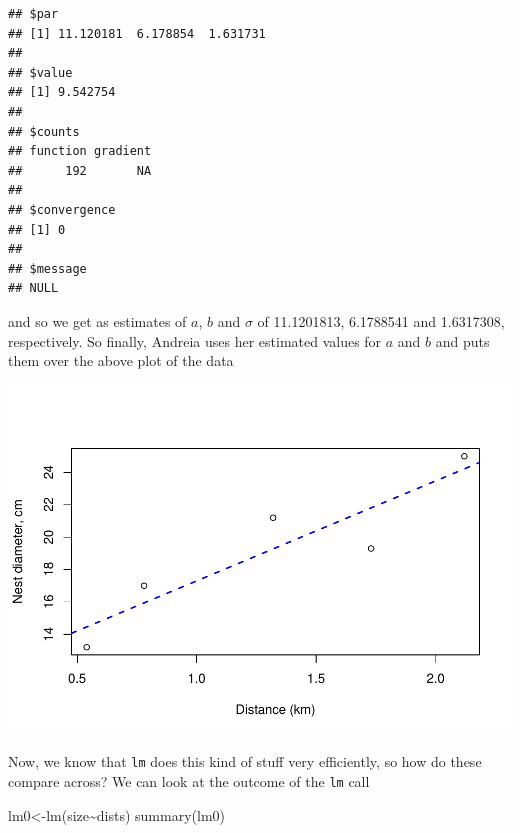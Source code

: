 \documentclass[
]{book}
\newenvironment{Shaded}{\begin{snugshade}}{\end{snugshade}}
\newcommand{\AttributeTok}[1]{\textcolor[rgb]{0.77,0.63,0.00}{#1}}
\newcommand{\DecValTok}[1]{\textcolor[rgb]{0.00,0.00,0.81}{#1}}
\newcommand{\FunctionTok}[1]{\textcolor[rgb]{0.00,0.00,0.00}{#1}}
\newcommand{\NormalTok}[1]{#1}
\newcommand{\OtherTok}[1]{\textcolor[rgb]{0.56,0.35,0.01}{#1}}
\newcommand{\SpecialCharTok}[1]{\textcolor[rgb]{0.00,0.00,0.00}{#1}}
\newcommand{\StringTok}[1]{\textcolor[rgb]{0.31,0.60,0.02}{#1}}
\begin{document}
\begin{verbatim}
## $par
## [1] 11.120181  6.178854  1.631731
## 
## $value
## [1] 9.542754
## 
## $counts
## function gradient 
##      192       NA 
## 
## $convergence
## [1] 0
## 
## $message
## NULL
\end{verbatim}

and so we get as estimates of \(a\), \(b\) and \(\sigma\) of 11.1201813, 6.1788541 and 1.6317308, respectively. So finally, Andreia uses her estimated values for \(a\) and \(b\) and puts them over the above plot of the data

\begin{Shaded}
\end{Shaded}

\includegraphics{ECOMODbook_files/figure-latex/ch13.29-1.pdf}

Now, we know that \texttt{lm} does this kind of stuff very efficiently, so how do these compare across? We can look at the outcome of the \texttt{lm} call

\begin{Shaded}
\begin{Highlighting}[]
\NormalTok{lm0}\OtherTok{\textless{}{-}}\FunctionTok{lm}\NormalTok{(size}\SpecialCharTok{\textasciitilde{}}\NormalTok{dists)}
\FunctionTok{summary}\NormalTok{(lm0)}
\end{Highlighting}
\end{Shaded}
\end{document}
